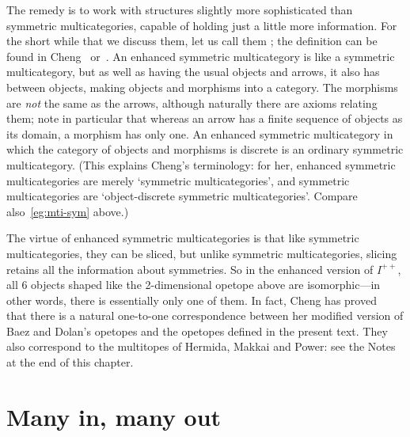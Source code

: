 The remedy is to work with structures slightly more sophisticated than
symmetric multicategories, capable of holding just a little more
information.  For the short while that we discuss them, let us call them
;%
%
%
%
%
%
%
the definition can be found in Cheng~\cite[2.1]{CheWOM}%
%
%
or~\cite[1.1]{CheWCO}.  An enhanced symmetric multicategory is like a
symmetric multicategory, but as well as having the usual objects and
arrows, it also has  between objects, making objects and
morphisms into a category.  The morphisms are \emph{not} the same as the
arrows, although naturally there are axioms relating them; note in
particular that whereas an arrow has a finite sequence of objects as its
domain, a morphism has only one.  An enhanced symmetric multicategory in
which the category of objects and morphisms is discrete is an ordinary
symmetric multicategory.  (This explains Cheng's terminology: for her,
enhanced symmetric multicategories are merely `symmetric multicategories',
and symmetric multicategories are `object-discrete symmetric
multicategories'.  Compare also~\ref{eg:mti-sym} above.)

The virtue of enhanced symmetric multicategories is that like symmetric
multicategories, they can be sliced, but unlike symmetric multicategories,
slicing retains all the information about symmetries.  So in the enhanced
version of $I^{++}$, all 6 objects shaped like the 2-dimensional opetope
above are isomorphic---in other words, there is essentially only one of
them.  In fact, Cheng%
%
%
has proved~\cite{CheWCO} that there is a natural
one-to-one correspondence between her modified version of Baez and Dolan's
opetopes and the opetopes defined in the present text.  They also
correspond to the multitopes%
%
%
of Hermida,%
%
%
Makkai%
%
%
and Power:%
%
%
see the Notes at
the end of this chapter.



\section{Many in, many out}
%
%
%


